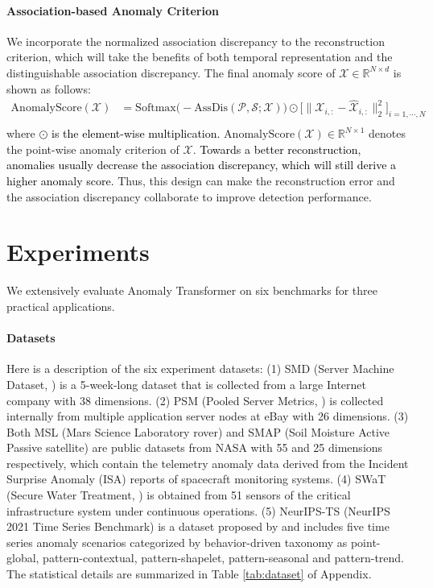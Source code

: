 \documentclass{article} %
\newcommand{\update}[1]{{\textcolor{black}{#1}}}
\begin{document}
\paragraph{Association-based Anomaly Criterion} We incorporate the normalized association discrepancy to the reconstruction criterion, which will take the benefits of both temporal representation and the distinguishable association discrepancy. The final anomaly score of $\mathcal{X}\in\mathbb{R}^{N\times d}$ is shown as follows:
\begin{equation}\label{equ:metric}
  \begin{split}
  \mathrm{AnomalyScore}(\mathcal{X})&=\mathrm{Softmax}\Big(-\mathrm{AssDis}(\mathcal{P},\mathcal{S};\mathcal{X})\Big)\odot\Big[\|\mathcal{X}_{i,:}-{\widehat{\mathcal{X}}}_{i,:}\|_{\text{2}}^2\Big]_{i=1,\cdots,N} \\
  \end{split}
\end{equation}
where \update{$\odot$ is the element-wise multiplication.} $\mathrm{AnomalyScore}(\mathcal{X})\in\mathbb{R}^{N\times 1}$ denotes the point-wise anomaly criterion of $\mathcal{X}$. 
\update{Towards a better reconstruction, anomalies usually decrease the association discrepancy, which will still derive a higher anomaly score.} Thus, this design can make the reconstruction error and the association discrepancy collaborate to improve detection performance.

\section{Experiments}
We extensively evaluate Anomaly Transformer on six benchmarks for three practical applications.

\vspace{-5pt}
\paragraph{Datasets} Here is a description of the six experiment datasets: 
(1) SMD (Server Machine Dataset, \cite{Su2019RobustAD}) is a 5-week-long dataset that is collected from a large Internet company with 38 dimensions.
(2) PSM (Pooled Server Metrics, \cite{DBLP:conf/kdd/AbdulaalLL21}) is collected internally from multiple application server nodes at eBay with 26 dimensions.
(3) Both MSL (Mars Science Laboratory rover) and SMAP (Soil Moisture Active Passive satellite) are public datasets from NASA \update{\citep{Hundman2018DetectingSA}} with 55 and 25 dimensions respectively, which contain the telemetry anomaly data derived from the Incident Surprise Anomaly (ISA) reports of spacecraft monitoring systems. 
(4) SWaT (Secure Water Treatment, \cite{DBLP:conf/cpsweek/MathurT16}) is obtained from 51 sensors of the critical infrastructure system under continuous operations.
(5) NeurIPS-TS (NeurIPS 2021 Time Series Benchmark) is a dataset proposed by \cite{Lai2021RevisitingTS} and includes five time series anomaly scenarios categorized by behavior-driven taxonomy as point-global, pattern-contextual, pattern-shapelet, pattern-seasonal and pattern-trend. 
The statistical details are summarized in Table \ref{tab:dataset} of Appendix.
\end{document}
